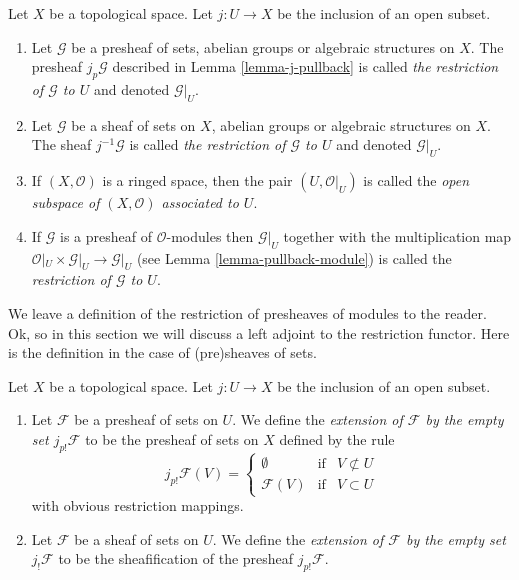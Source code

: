\begin{definition}
\label{definition-restriction}
Let $X$ be a topological space.
Let $j : U \to X$ be the inclusion of an open subset.
\begin{enumerate}
\item Let $\mathcal{G}$ be a presheaf of sets, abelian groups or
algebraic structures on $X$. The presheaf $j_p\mathcal{G}$ described
in Lemma \ref{lemma-j-pullback} is called
{\it the restriction of $\mathcal{G}$ to $U$} and denoted $\mathcal{G}|_U$.
\item Let $\mathcal{G}$ be a sheaf of sets on $X$, abelian groups or
algebraic structures on $X$. The sheaf $j^{-1}\mathcal{G}$ is called
{\it the restriction of $\mathcal{G}$ to $U$} and denoted $\mathcal{G}|_U$.
\item If $(X, \mathcal{O})$ is a ringed space, then the pair
$(U, \mathcal{O}|_U)$ is called the
{\it open subspace of $(X, \mathcal{O})$ associated to $U$}.
\item If $\mathcal{G}$ is a presheaf of $\mathcal{O}$-modules
then $\mathcal{G}|_U$ together with the multiplication map
$\mathcal{O}|_U \times \mathcal{G}|_U \to \mathcal{G}|_U$
(see Lemma \ref{lemma-pullback-module})
is called the {\it restriction of $\mathcal{G}$ to $U$}.
\end{enumerate}
\end{definition}

\noindent
We leave a definition of the restriction of presheaves
of modules to the reader. Ok, so in this section we will
discuss a left adjoint to the restriction functor.
Here is the definition in the case of (pre)sheaves
of sets.

\begin{definition}
\label{definition-j-shriek}
Let $X$ be a topological space.
Let $j : U \to X$ be the inclusion of an open subset.
\begin{enumerate}
\item Let $\mathcal{F}$ be a presheaf of sets on $U$. We define
the {\it extension of $\mathcal{F}$ by the empty set $j_{p!}\mathcal{F}$}
to be the presheaf of sets on $X$ defined by the rule
$$
j_{p!}\mathcal{F}(V) =
\left\{
\begin{matrix}
\emptyset & \text{if} & V \not \subset U \\
\mathcal{F}(V) & \text{if} & V \subset U
\end{matrix}
\right.
$$
with obvious restriction mappings.
\item Let $\mathcal{F}$ be a sheaf of sets on $U$. We define
the {\it extension of $\mathcal{F}$ by the empty set $j_!\mathcal{F}$}
to be the sheafification of the presheaf $j_{p!}\mathcal{F}$.
\end{enumerate}
\end{definition}

